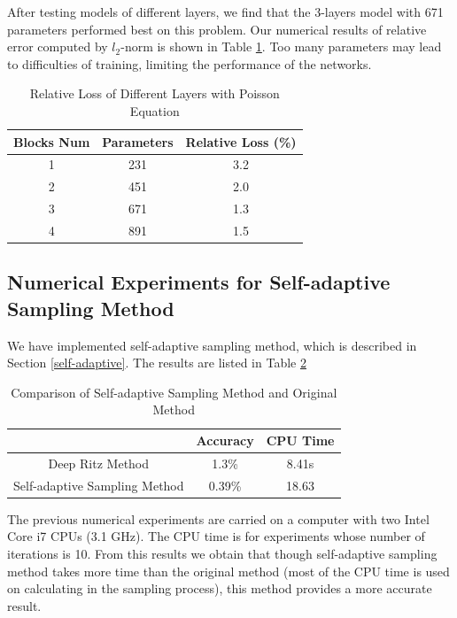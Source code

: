 \documentclass{article}
\begin{document}
\par After testing models of different layers, we find that the 3-layers model with 671 parameters performed best on this problem. Our numerical results of relative error computed by $l_2$-norm is shown in Table \ref{different layers of poisson equation}. Too many parameters may lead to difficulties of training, limiting the performance of the networks.

\begin{table}
\centering  
\caption{Relative Loss of Different Layers with Poisson Equation}
\label{different layers of poisson equation}
\begin{tabular}{ccc} 
	\toprule  %
	Blocks Num & Parameters & Relative Loss (\%) \\
	\hline
	1 & 231 & 3.2\\
	\hline
	2 & 451 & 2.0\\
	\hline
	3 & 671 & 1.3\\
	\hline
	4 & 891 & 1.5\\
	\bottomrule %
\end{tabular}
\end{table}

\subsection{Numerical Experiments for Self-adaptive Sampling Method}
\par We have implemented self-adaptive sampling method, which is described in Section \ref{self-adaptive}. The results are listed in Table \ref{adaptive experiments}
\begin{table}
	\centering
	\caption{Comparison of Self-adaptive Sampling Method and Original Method}
	\label{adaptive experiments}
	\begin{tabular}{ccc}
		\toprule
		& Accuracy & CPU Time\\
		\hline
		Deep Ritz Method & 1.3\% & 8.41s\\
		\hline
		Self-adaptive Sampling Method & 0.39\% & 18.63\\
		\bottomrule
	\end{tabular}
\end{table}
\par The previous numerical experiments are carried on a computer with two Intel Core i7 CPUs (3.1 GHz). The CPU time is for experiments whose number of iterations is 10. From this results we obtain that though self-adaptive sampling method takes more time than the original method (most of the CPU time is used on calculating in the sampling process), this method provides a more accurate result. 
\end{document}

